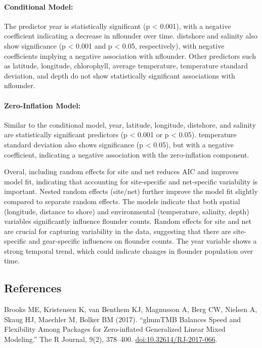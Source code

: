 \documentclass[
]{article}
\begin{document}
\paragraph{Conditional Model:}\label{conditional-model-1}

The predictor year is statistically significant (p \textless{} 0.001),
with a negative coefficient indicating a decrease in nflounder over
time. distshore and salinity also show significance (p \textless{} 0.001
and p \textless{} 0.05, respectively), with negative coefficients
implying a negative association with nflounder. Other predictors such as
latitude, longitude, chlorophyll, average temperature, temperature
standard deviation, and depth do not show statistically significant
associations with nflounder.

\paragraph{Zero-Inflation Model:}\label{zero-inflation-model-1}

Similar to the conditional model, year, latitude, longitude, distshore,
and salinity are statistically significant predictors (p \textless{}
0.001 or p \textless{} 0.05). temperature standard deviation also shows
significance (p \textless{} 0.05), but with a negative coefficient,
indicating a negative association with the zero-inflation component.

Overal, including random effects for site and net reduces AIC and
improves model fit, indicating that accounting for site-specific and
net-specific variability is important. Nested random effects (site/net)
further improve the model fit slightly compared to separate random
effects. The models indicate that both spatial (longitude, distance to
shore) and environmental (temperature, salinity, depth) variables
significantly influence flounder counts. Random effects for site and net
are crucial for capturing variability in the data, suggesting that there
are site-specific and gear-specific influences on flounder counts. The
year variable shows a strong temporal trend, which could indicate
changes in flounder population over time.

\subsection{References}\label{references}

Brooks ME, Kristensen K, van Benthem KJ, Magnusson A, Berg CW, Nielsen
A, Skaug HJ, Maechler M, Bolker BM (2017). ``glmmTMB Balances Speed and
Flexibility Among Packages for Zero-inflated Generalized Linear Mixed
Modeling.'' The R Journal, 9(2), 378--400.
\url{doi:10.32614/RJ-2017-066}.
\end{document}
